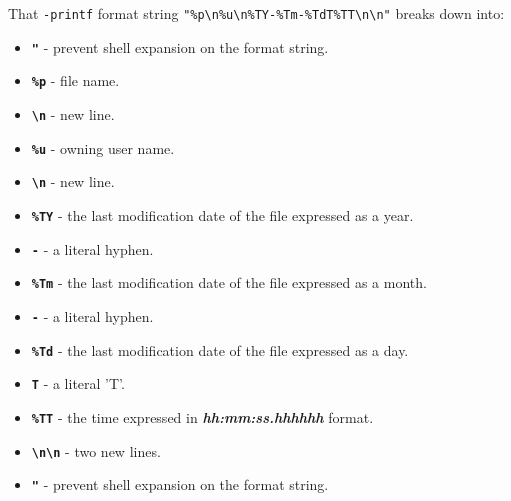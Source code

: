\documentclass[10pt,american,]{book}
\newenvironment{Shaded}{\begin{snugshade}}{\end{snugshade}}
\newcommand{\KeywordTok}[1]{\textcolor[rgb]{0.13,0.29,0.53}{\textbf{{#1}}}}
\newcommand{\StringTok}[1]{\textcolor[rgb]{0.31,0.60,0.02}{{#1}}}
\newcommand{\NormalTok}[1]{{#1}}
\providecommand{\tightlist}{%
  \setlength{\itemsep}{0pt}\setlength{\parskip}{0pt}}
\numberwithin{figure}{chapter}
\renewcommand{\KeywordTok}[1]{{#1}}
\renewcommand{\StringTok}[1]{{#1}}
\renewcommand{\NormalTok}[1]{{#1}}
\begin{document}
\begin{Shaded}
\end{Shaded}

That \texttt{-printf} format string
\texttt{"\%p\textbackslash{}n\%u\textbackslash{}n\%TY-\%Tm-\%TdT\%TT\textbackslash{}n\textbackslash{}n"}
breaks down into:

\begin{itemize}
\tightlist
\item
  \textbf{\texttt{"}} - prevent shell expansion on the format string.
\item
  \textbf{\texttt{\%p}} - file name.
\item
  \textbf{\texttt{\textbackslash{}n}} - new line.
\item
  \textbf{\texttt{\%u}} - owning user name.
\item
  \textbf{\texttt{\textbackslash{}n}} - new line.
\item
  \textbf{\texttt{\%TY}} - the last modification date of the file
  expressed as a year.
\item
  \textbf{\texttt{-}} - a literal hyphen.
\item
  \textbf{\texttt{\%Tm}} - the last modification date of the file
  expressed as a month.
\item
  \textbf{\texttt{-}} - a literal hyphen.
\item
  \textbf{\texttt{\%Td}} - the last modification date of the file
  expressed as a day.
\item
  \textbf{\texttt{T}} - a literal 'T'.
\item
  \textbf{\texttt{\%TT}} - the time expressed in
  \textbf{\emph{hh:mm:ss.hhhhhh}} format.
\item
  \textbf{\texttt{\textbackslash{}n\textbackslash{}n}} - two new lines.
\item
  \textbf{\texttt{"}} - prevent shell expansion on the format string.
\end{itemize}
\end{document}
